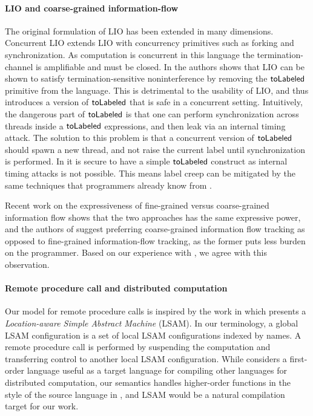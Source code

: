 \paragraph{LIO and coarse-grained information-flow}
The original formulation of LIO \cite{SRMMlio} has been extended in many dimensions. Concurrent LIO \cite{Stefan:2012:ACT:2364527.2364557} extends LIO with concurrency primitives such as forking and synchronization. As computation is concurrent in this language the termination-channel is amplifiable and must be closed. In \cite{Stefan:2012:ACT:2364527.2364557} the authors shows that LIO can be shown to satisfy termination-sensitive noninterference by removing the $\mathsf{toLabeled}$ primitive from the language. This is detrimental to the usability of LIO, and thus \cite{Stefan:2012:ACT:2364527.2364557} introduces a version of $\mathsf{toLabeled}$ that is safe in a concurrent setting. Intuitively, the dangerous part of $\mathsf{toLabeled}$ is that one can perform synchronization across threads inside a $\mathsf{toLabeled}$ expressions, and then leak via an internal timing attack. The solution to this problem is that a concurrent version of $\mathsf{toLabeled}$ should spawn a new thread, and not raise the current label until synchronization is performed. In \lang{} it is secure to have a simple $\mathsf{toLabeled}$ construct as internal timing attacks is not possible. This means label creep can be mitigated by the same techniques that programmers already know from \cite{SRMMlio}.

Recent work \cite{Rajani:2017:TSI:3051528.3051531} on the expressiveness of fine-grained versus coarse-grained information flow shows that the two approaches has the same expressive power, and the authors of \cite{Rajani:2017:TSI:3051528.3051531} suggest preferring coarse-grained information flow tracking as opposed to fine-grained information-flow tracking, as the former puts less burden on the programmer. Based on our experience with \lang{}, we agree with this observation.

\paragraph{Remote procedure call and distributed computation}
Our model for remote procedure calls is inspired by the work in \cite{10.1007/978-3-642-25462-8_28} which presents a \emph{Location-aware Simple Abstract Machine} (LSAM). In our terminology, a global LSAM configuration is a set of local LSAM configurations indexed by names. A remote procedure call is performed by suspending the computation and transferring control to another local LSAM configuration. While \cite{10.1007/978-3-642-25462-8_28} considers a first-order language useful as a target language for compiling other languages for distributed computation, our semantics handles higher-order functions in the style of the source language in \cite{Cooper:2009:RC:1599410.1599439}, and LSAM would be a natural compilation target for our work.